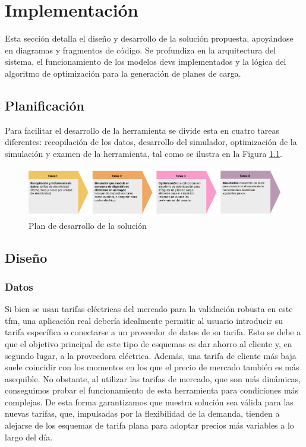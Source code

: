 \documentclass[11pt,a4paper]{book}
\begin{document}

\clearpage
\chapter{Implementación}
Esta sección detalla el diseño y desarrollo de la solución propuesta, apoyándose en diagramas y fragmentos de código. Se profundiza en la arquitectura del sistema, el funcionamiento de los modelos \gls{devs} implementados y la lógica del algoritmo de optimización para la generación de planes de carga.

\section{Planificación}
Para facilitar el desarrollo de la herramienta se divide esta en cuatro tareas diferentes: recopilación de los datos, desarrollo del simulador, optimización de la simulación y examen de la herramienta, tal como se ilustra en la Figura \ref{fig:plan-desarrollo}.

\begin{figure}
    \centering
    \includegraphics[width=0.95\linewidth]{fig/proceso.png}
    \caption{Plan de desarrollo de la solución}
    \label{fig:plan-desarrollo}
\end{figure}
\section{Diseño}

\subsection{Datos}
Si bien se usan tarifas eléctricas del mercado para la validación robusta en este \gls{tfm}, una aplicación real debería idealmente permitir al usuario introducir su tarifa específica o conectarse a un proveedor de datos de su tarifa. Esto se debe a que el objetivo principal de este tipo de esquemas es dar ahorro al cliente y, en segundo lugar, a la proveedora eléctrica. Además, una tarifa de cliente más baja suele coincidir  con los momentos en los que el precio de mercado también es más asequible. No obstante, al utilizar las tarifas de mercado, que son más dinámicas, conseguimos probar el funcionamiento de esta herramienta para condiciones más complejas. De esta forma garantizamos que nuestra solución sea válida para las nuevas tarifas, que, impulsadas por la flexibilidad de la demanda, tienden a alejarse de los esquemas de tarifa plana para adoptar precios más variables a lo largo del día. 
\end{document}
